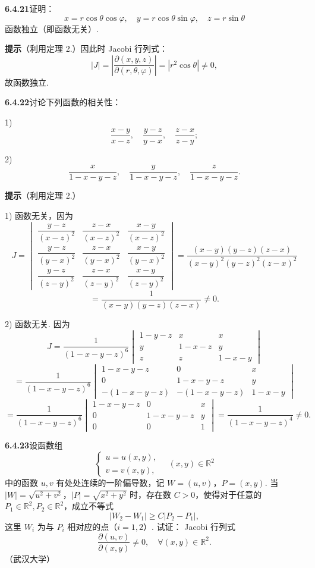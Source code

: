 \documentclass[UTF8,12pt,a4paper,fontset=fandol]{ctexart}
\begin{document}
\noindent\textbf{6.4.21}\quad 证明：
\[
  x=r\cos\theta\cos\varphi,\quad
  y=r\cos\theta\sin\varphi,\quad
  z=r\sin\theta
\]
函数独立（即函数无关）.

\noindent\textbf{提示}\quad （利用定理 2.）因此时 Jacobi 行列式：
\[
  |J|=\left|\frac{\partial(x,y,z)}{\partial(r,\theta,\varphi)}\right|
  =|r^2\cos\theta|\ne0,
\]
故函数独立.

\noindent\textbf{6.4.22}\quad 讨论下列函数的相关性：

1)
\[
  \frac{x-y}{x-z},\quad \frac{y-z}{y-x},\quad \frac{z-x}{z-y};
\]

2)
\[
  \frac{x}{1-x-y-z},\quad
  \frac{y}{1-x-y-z},\quad
  \frac{z}{1-x-y-z}.
\]

\noindent\textbf{提示}\quad （利用定理 2.）

1) 函数无关，因为
\[
J=
\begin{vmatrix}
  \dfrac{y-z}{(x-z)^2}&\dfrac{z-x}{(x-z)^2}&\dfrac{x-y}{(x-z)^2}\\[6pt]
  \dfrac{y-z}{(y-x)^2}&\dfrac{z-x}{(y-x)^2}&\dfrac{x-y}{(y-x)^2}\\[6pt]
  \dfrac{y-z}{(z-y)^2}&\dfrac{z-x}{(z-y)^2}&\dfrac{x-y}{(z-y)^2}
\end{vmatrix}
=
\frac{(x-y)(y-z)(z-x)}
{(x-y)^2(y-z)^2(z-x)^2}
\]
\[
  =
  \frac1{(x-y)(y-z)(z-x)}\ne0.
\]

2) 函数无关. 因为
\[
  J=\frac1{(1-x-y-z)^6}
  \begin{vmatrix}
    1-y-z&x&x\\
    y&1-x-z&y\\
    z&z&1-x-y
  \end{vmatrix}
\]
\[
  =
  \frac1{(1-x-y-z)^6}
  \begin{vmatrix}
    1-x-y-z&0&x\\
    0&1-x-y-z&y\\
    -(1-x-y-z)&-(1-x-y-z)&1-x-y
  \end{vmatrix}
\]
\[
  =
  \frac1{(1-x-y-z)^6}
  \begin{vmatrix}
    1-x-y-z&0&x\\
    0&1-x-y-z&y\\
    0&0&1
  \end{vmatrix}
  =
  \frac1{(1-x-y-z)^4}\ne0.
\]

\noindent\textbf{6.4.23}\quad 设函数组
\[
\begin{cases}
  u=u(x,y),\\
  v=v(x,y),
\end{cases}
\quad (x,y)\in\mathbb R^2
\]
中的函数 $u,v$ 有处处连续的一阶偏导数，记 $W=(u,v)$，$P=(x,y)$. 当
$|W|=\sqrt{u^2+v^2}$，$|P|=\sqrt{x^2+y^2}$ 时，存在数 $C>0$，使得对于任意的
$P_1\in\mathbb R^2,P_2\in\mathbb R^2$，成立不等式
\[
  |W_2-W_1|\ge C|P_2-P_1|,
\]
这里 $W_i$ 为与 $P_i$ 相对应的点（$i=1,2$）. 试证：
Jacobi 行列式
\[
  \frac{\partial(u,v)}{\partial(x,y)}\ne0,\quad \forall(x,y)\in\mathbb R^2.
\]
（武汉大学）
\end{document}
